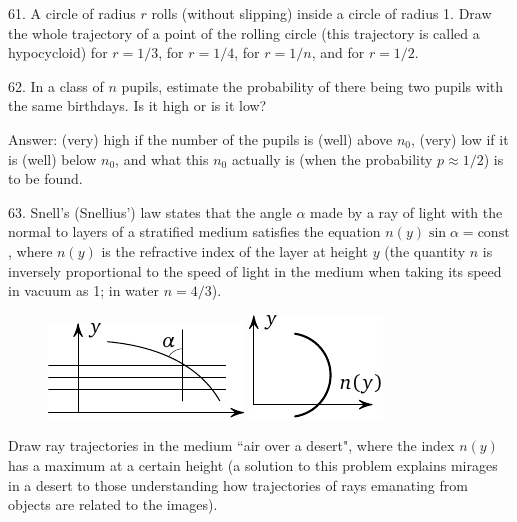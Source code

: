 \begin{problem}{61.}
	A circle of radius $r$ rolls (without slipping) inside a circle of radius 1.
	Draw the whole trajectory of a point of the rolling circle (this trajectory is called a hypocycloid) 
	for $r=1/3$, for $r=1/4$, for $r=1/n$, and for $r=1/2$.
\end{problem}

\begin{problem}{62.}
	In a class of $n$ pupils, estimate the probability of there being two pupils with the same birthdays. Is it high or is it low?

	\begin{note}{Answer:}
		(very) high if the number of the pupils is (well) above $n_0$,
		(very) low if it is (well) below $n_0$, and what this $n_0$ actually is
		(when the probability $p \approx 1/2$) is to be found.
	\end{note}
\end{problem}

\begin{problem}{63.}
	Snell's (Snellius') law states that the angle $\alpha$ made by a ray of light with the normal to layers of a stratified medium satisfies the equation $n(y) \sin \alpha=\text{const}$,
	where $n(y)$ is the refractive index of the layer at height $y$ (the quantity $n$ is 
	inversely proportional to the speed 
	of light in the medium when taking its speed in vacuum as 1; in water $n=4/3$).
	\begin{figure}[h]
	\centering
	\includegraphics{taskbook-47}\hskip2cm
	\includegraphics{taskbook-471}
	\end{figure}

	Draw ray trajectories in the medium  ``air over a desert", where the index $n(y)$ has a maximum
	at a certain height
	(a solution to this problem explains mirages in a desert to those understanding how trajectories of rays emanating from objects are related to the images).
\end{problem}

